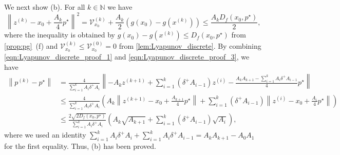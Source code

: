 \documentclass[11pt,a4paper]{article}
\theoremstyle{definition}
\theoremstyle{plain}
\newcommand{\NN}{{\mathbb{N}}}
\begin{document}
    We next show (b).
    For all $k \in \NN$ we have
    \begin{equation}\label{eqn:Lyapunov_discrete_proof_3}
        \left\|z^{(k)} - x_0 + \frac{A_k}4p^\star\right\|^2
        = \mathcal{V}_{x_0}^{(k)} + \frac{A_k}2\left(g(x_0) - g\left(x^{(k)}\right)\right)
        \le \frac{A_kD_f(x_0, p^\star)}2,
    \end{equation}
    where the inequality is obtained by $g(x_0) - g(x^{(k)}) \le D_f(x_0, p^\star)$ from \cref{prop:pg}~(f) and $\mathcal{V}_{x_0}^{(k)} \le \mathcal{V}_{x_0}^{(0)} = 0$ from \cref{lem:Lyapunov_discrete}.
    By combining \eqref{eqn:Lyapunov_discrete_proof_1} and \eqref{eqn:Lyapunov_discrete_proof_3}, we have
    \begin{align*}
        \left\|p^{(k)} - p^\star\right\|
        &= \frac{4}{\sum_{i = 1}^kA_i\delta^+A_i}\left\|-A_kz^{(k + 1)} +\sum_{i = 1}^k(\delta^+A_{i - 1})z^{(i)} - \frac{A_kA_{k + 1} - \sum_{i = 1}^kA_i\delta^+A_{i - 1}}4p^\star\right\|\\
        &\le \frac{4}{\sum_{i = 1}^kA_i\delta^+A_i}\left(A_k\left\|z^{(k + 1)} - x_0 + \frac{A_{k + 1}}4p^\star\right\| + \sum_{i = 1}^k(\delta^+A_{i - 1})\left\|z^{(i)} - x_0 + \frac{A_i}4p^\star\right\|\right)\\
        &\le \frac{2\sqrt{2D_f(x_0, p^\star)}}{\sum_{i = 1}^kA_i\delta^+A_i}\left(A_k\sqrt{A_{k + 1}} + \sum_{i = 1}^k(\delta^+A_{i - 1})\sqrt{A_i}\right),
    \end{align*}
    where we used an identity $\sum_{i = 1}^kA_i\delta^+A_i + \sum_{i = 1}^kA_i\delta^+A_{i - 1} = A_kA_{k + 1} - A_0A_1$ for the first equality.
    Thus, (b) has been proved.
\end{document}
